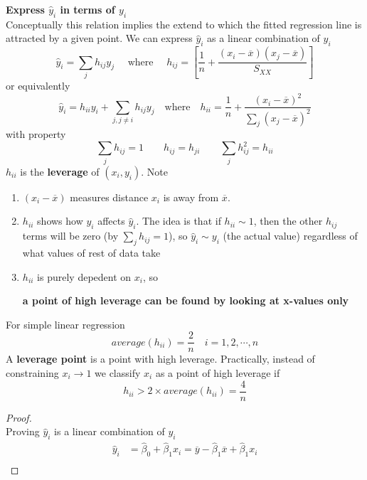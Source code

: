 \documentclass[11pt]{article}
\begin{document}
\begin{defn*}
    \textbf{Express $\hat{y}_i$ in terms of $y_i$}\\
    Conceptually this relation implies the extend to which the fitted regression line is attracted by a given point. We can express $\hat{y}_i$ as a linear combination of $y_i$ \\
    \[
        \hat{y}_i 
        = \sum_j h_{ij} y_j \quad \text{ where }\quad 
        h_{ij} = \left[ \frac{1}{n} + \frac{(x_i - \overline{x})(x_j - \overline{x})}{S_{XX}} \right]
    \]
    or equivalently 
    \[
        \hat{y}_i = h_{ii} y_i + \sum_{j, j\neq i} h_{ij} y_j 
        \quad \text{where}\quad 
        h_{ii} = \frac{1}{n} + \frac{(x_i - \overline{x})^2}{\sum_j (x_j - \overline{x})^2}
    \]
    with property  
    \[
        \sum_j h_{ij} = 1 \quad \quad 
        h_{ij} = h_{ji} \quad\quad 
        \sum_j h_{ij}^2 = h_{ii}
    \]
    $h_{ii}$ is the \textbf{leverage} of $(x_i, y_i)$. Note 
    \begin{enumerate}
        \item $(x_i-\overline{x})$ measures distance $x_i$ is away from $\overline{x}$. 
        \item $h_{ii}$ shows how $y_i$ affects $\hat{y}_i$. The idea is that if $h_{ii} \sim 1$, then the other $h_{ij}$ terms will be zero (by $\sum_j h_{ij} = 1$), so $\hat{y}_i \sim y_i$ (the actual value) regardless of what values of rest of data take
        \item $h_{ii}$ is purely depedent on $x_i$, so 
        \begin{center}
            \textbf{a point of high leverage can be found by looking at x-values only}
        \end{center}
    \end{enumerate}
    For simple linear regression
    \[
        average(h_{ii}) = \frac{2}{n} \quad i = 1,2,\cdots,n
    \]
    A \textbf{leverage point} is a point with high leverage. Practically, instead of constraining $x_i \to 1$ we classify $x_i$ as a point of high leverage if 
    \[
        h_{ii} > 2\times average(h_{ii}) = \frac{4}{n}
    \]
    \begin{proof}
        $ $\\
        Proving $\hat{y}_i$ is a linear combination of $y_i$
        \begin{align*}
            \hat{y}_i 
            &= \hat{\beta}_0 + \hat{\beta}_1 x_i  
            = \overline{y} - \hat{\beta}_1 \overline{x} + \hat{\beta}_1 x_i \\ 

\end{align*}
\end{proof}
\end{defn*}
\end{document}
